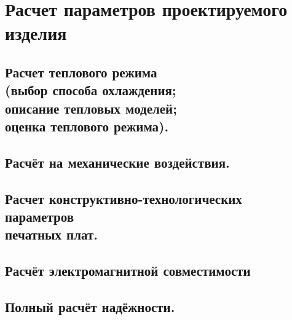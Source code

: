 \section{Расчет параметров проектируемого изделия}

\subsection{Расчет теплового режима \\
  (выбор способа охлаждения; \\
  описание тепловых моделей; \\
  оценка теплового режима). }



\subsection{Расчёт на механические воздействия. }


\subsection{Расчет конструктивно-технологических параметров\\
  печатных плат. }


\subsection{Расчёт электромагнитной совместимости}


\subsection{Полный расчёт надёжности. }

